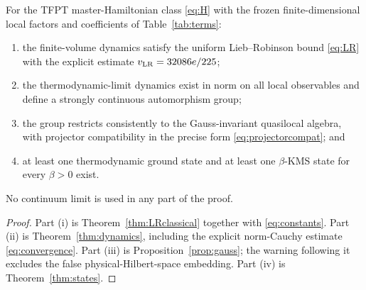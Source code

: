 \begin{theorem}
\label{thm:combined}
For the TFPT master-Hamiltonian class \eqref{eq:H} with the frozen
finite-dimensional local factors and coefficients of
Table~\ref{tab:terms}:
\begin{enumerate}[label=\textup{(\roman*)}]
\item the finite-volume dynamics satisfy the uniform Lieb--Robinson bound
\eqref{eq:LR} with the explicit estimate
\(v_{\rm LR}=32086e/225\);
\item the thermodynamic-limit dynamics exist in norm on all local
observables and define a strongly continuous automorphism group;
\item the group restricts consistently to the Gauss-invariant quasilocal
algebra, with projector compatibility in the precise form
\eqref{eq:projectorcompat}; and
\item at least one thermodynamic ground state and at least one
\(\beta\)-KMS state for every \(\beta>0\) exist.
\end{enumerate}
No continuum limit is used in any part of the proof.
\end{theorem}

\begin{proof}
Part (i) is Theorem~\ref{thm:LRclassical} together with
\eqref{eq:constants}.  Part (ii) is Theorem~\ref{thm:dynamics}, including
the explicit norm-Cauchy estimate \eqref{eq:convergence}.  Part (iii) is
Proposition~\ref{prop:gauss}; the warning following it excludes the false
physical-Hilbert-space embedding.  Part (iv) is Theorem~\ref{thm:states}.
\end{proof}

\begin{center}
\setlength{\fboxsep}{10pt}
\end{center}

